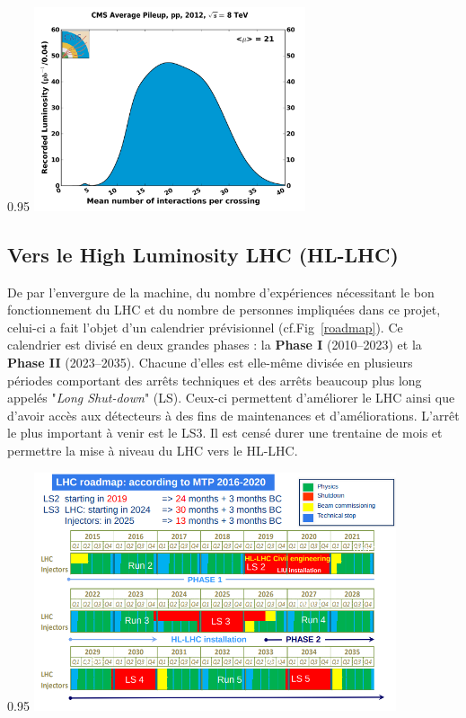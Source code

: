 \begin{minipagewithmarginpars}[ht!]{0.95\textwidth}
	\centering
	\includegraphics[width=0.60\textwidth]{LHC/pileup.png}
	\label{pile-up}	
\end{minipagewithmarginpars}

\subsection{Vers le High Luminosity LHC (HL-LHC)}
De par l'envergure de la machine, du nombre d'expériences nécessitant le bon fonctionnement du LHC et du nombre de personnes impliquées dans ce projet, celui-ci a fait l'objet d'un calendrier prévisionnel (cf.Fig~\ref{roadmap}). Ce calendrier est divisé en deux grandes phases : la \textbf{Phase I} (\num{2010}--\num{2023}) et la  \textbf{Phase II} (\num{2023}--\num{2035}). Chacune d'elles est elle-même divisée en plusieurs périodes comportant des arrêts techniques et des arrêts beaucoup plus long appelés "\textit{Long Shut-down}" (LS). Ceux-ci permettent d'améliorer le LHC ainsi que d'avoir accès aux détecteurs à des fins de maintenances et d'améliorations. L'arrêt le plus important à venir est le LS3. Il est censé durer une trentaine de mois et permettre la mise à niveau du LHC vers le HL-LHC.

\begin{minipagewithmarginpars}[ht!]{0.95\textwidth}
	\centering
	\includegraphics[width=0.80\textwidth]{LHC/roadmap.png}
	\label{roadmap}	
\end{minipagewithmarginpars}

